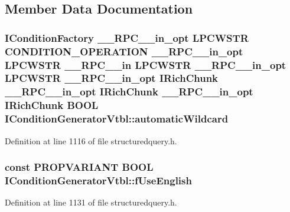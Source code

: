 \subsection{Member Data Documentation}
\subsubsection[{\texorpdfstring{automatic\+Wildcard}{automaticWildcard}}]{ {\bf I\+Condition\+Factory} {\bf \+\_\+\+\_\+\+R\+P\+C\+\_\+\+\_\+in\+\_\+opt} {\bf L\+P\+C\+W\+S\+TR} {\bf C\+O\+N\+D\+I\+T\+I\+O\+N\+\_\+\+O\+P\+E\+R\+A\+T\+I\+ON} {\bf \+\_\+\+\_\+\+R\+P\+C\+\_\+\+\_\+in\+\_\+opt} {\bf L\+P\+C\+W\+S\+TR} {\bf \+\_\+\+\_\+\+R\+P\+C\+\_\+\+\_\+in} {\bf L\+P\+C\+W\+S\+TR} {\bf \+\_\+\+\_\+\+R\+P\+C\+\_\+\+\_\+in\+\_\+opt} {\bf L\+P\+C\+W\+S\+TR} {\bf \+\_\+\+\_\+\+R\+P\+C\+\_\+\+\_\+in\+\_\+opt} {\bf I\+Rich\+Chunk} {\bf \+\_\+\+\_\+\+R\+P\+C\+\_\+\+\_\+in\+\_\+opt} {\bf I\+Rich\+Chunk} {\bf \+\_\+\+\_\+\+R\+P\+C\+\_\+\+\_\+in\+\_\+opt} {\bf I\+Rich\+Chunk} {\bf B\+O\+OL} I\+Condition\+Generator\+Vtbl\+::automatic\+Wildcard}\hypertarget{struct_i_condition_generator_vtbl_a90b8b9d27fd61111d12aef0d68a0b454}{}\label{struct_i_condition_generator_vtbl_a90b8b9d27fd61111d12aef0d68a0b454}


Definition at line 1116 of file structuredquery.\+h.

\subsubsection[{\texorpdfstring{f\+Use\+English}{fUseEnglish}}]{ {\bf const} {\bf P\+R\+O\+P\+V\+A\+R\+I\+A\+NT} {\bf B\+O\+OL} I\+Condition\+Generator\+Vtbl\+::f\+Use\+English}\hypertarget{struct_i_condition_generator_vtbl_a03e376af9a791f1def99db7181928acd}{}\label{struct_i_condition_generator_vtbl_a03e376af9a791f1def99db7181928acd}


Definition at line 1131 of file structuredquery.\+h.

